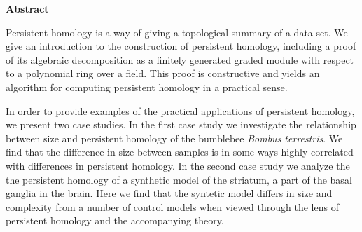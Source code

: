 \newenvironment{abstract}%
    {\cleardoublepage\thispagestyle{empty}\null\vfill\begin{center}%
    \bfseries Abstract \end{center}}%
    {\vfill\null}
        \begin{abstract}
          Persistent homology is a way of giving a topological summary of a data-set. We give an introduction to the construction of persistent homology, including a proof of its algebraic decomposition as a finitely generated graded module with respect to a polynomial ring over a field. This proof is constructive and yields an algorithm for computing persistent homology in a practical sense.

          In order to provide examples of the practical applications of persistent homology, we present two case studies. In the first case study we investigate the relationship between size and persistent homology of the bumblebee \textit{Bombus terrestris}. We find that the difference in size between samples is in some ways highly correlated with differences in persistent homology. In the second case study we analyze the the persistent homology of a synthetic model of the striatum, a part of the basal ganglia in the brain. Here we find that the syntetic model differs in size and complexity from a number of control models when viewed through the lens of persistent homology and the accompanying theory. \end{abstract}
